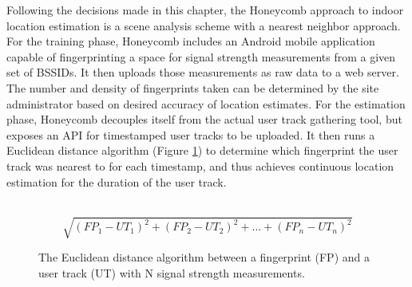 Following the decisions made in this chapter, the Honeycomb approach to indoor location estimation is a scene analysis scheme with a nearest neighbor approach. For the training phase, Honeycomb includes an Android mobile application capable of fingerprinting a space for signal strength measurements from a given set of BSSIDs. It then uploads those measurements as raw data to a web server. The number and density of fingerprints taken can be determined by the site administrator based on desired accuracy of location estimates. For the estimation phase, Honeycomb decouples itself from the actual user track gathering tool, but exposes an API for timestamped user tracks to be uploaded. It then runs a Euclidean distance algorithm (Figure \ref{euclideandistance}) to determine which fingerprint the user track was nearest to for each timestamp, and thus achieves continuous location estimation for the duration of the user track. 

\begin{figure}[htb] 
	\begin{center}
		\ \[ \sqrt{(FP_{1} - UT_{1})^2 + (FP_{2} - UT_{2})^2 + ... + (FP_{n} - UT_{n})^2} \]
		\caption{The Euclidean distance algorithm between a fingerprint (FP) and a user track (UT) with N signal strength measurements.}
		\label{euclideandistance}
	\end{center}
\end{figure}